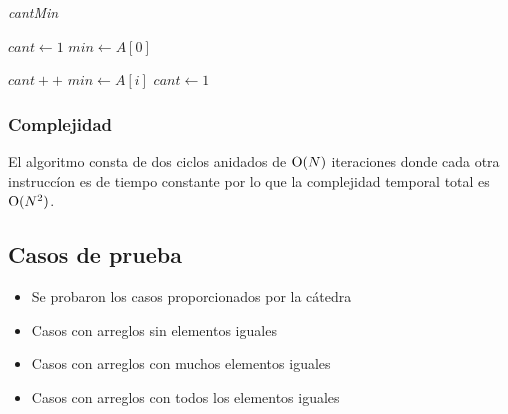 \bigskip

\begin{algorithm}[H]
	\caption{\textit{cantMin}}

	$cant \gets 1$ \;
	$min \gets A[0]$ \;

     {
    	 {
    		$cant++$ \;
    	}
    	 {
			$min \gets A[i]$ \;
    		$cant \gets 1$ \;
    	}
	}

\end{algorithm}

\bigskip

\subsubsection{Complejidad}

El algoritmo consta de dos ciclos anidados de $\operatorname{O}(N)$ iteraciones donde cada
otra instruccíon es de tiempo constante por lo que la complejidad temporal
total es $\operatorname{O}(N^2)$.

\subsection{Casos de prueba}

\begin{itemize}
\item Se probaron los casos proporcionados por la cátedra
\item Casos con arreglos sin elementos iguales
\item Casos con arreglos con muchos elementos iguales
\item Casos con arreglos con todos los elementos iguales
\end{itemize}